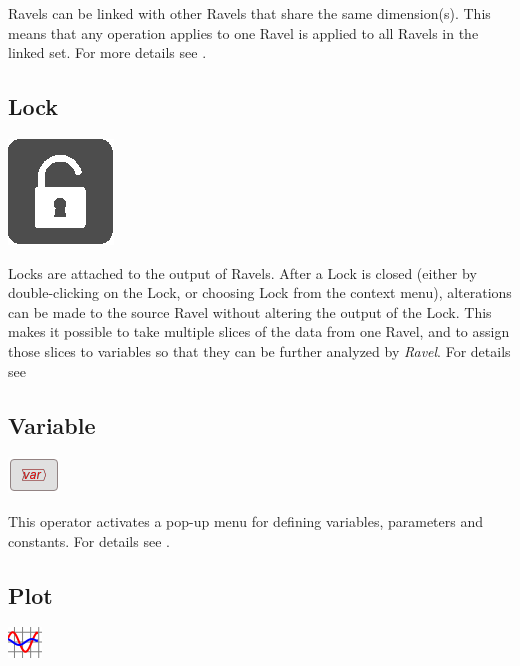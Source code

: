 Ravels can be linked with other Ravels that share the same dimension(s).
This means that any operation applies to one Ravel is applied to all
Ravels in the linked set. For more details see .

\subsection{Lock}

\begin{center}
  \includegraphics{images/Lock}
\end{center}

Locks are attached to the output of Ravels. After a Lock is closed
(either by double-clicking on the Lock, or choosing Lock from the
context menu), alterations can be made to the source Ravel without
altering the output of the Lock. This makes it possible to take multiple
slices of the data from one Ravel, and to assign those slices to variables
so that they can be further analyzed by \emph{Ravel}. For details
see 

\subsection{Variable}

\begin{center}
  \includegraphics{images/var}
\end{center}
    
This operator activates a pop-up menu for defining variables, parameters
and constants. For details see .

\subsection{Plot}
\begin{center}
  \includegraphics{images/plot}
\end{center}


